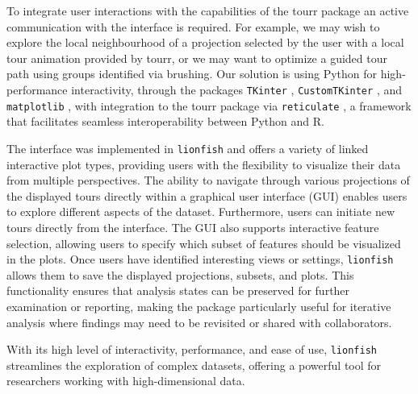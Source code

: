 \documentclass[article]{ajs}
\begin{document}
To integrate user interactions with the capabilities of the tourr package an active communication with the interface is required. For example, we may wish to explore the local neighbourhood of a projection selected by the user with a local tour animation provided by tourr, or we may want to optimize a guided tour path using groups identified via brushing.
Our solution is using Python for high-performance interactivity, through the packages \texttt{TKinter} \citep{lundh1999introduction}, \texttt{CustomTKinter} \citep{schimansky24}, and \texttt{matplotlib} \citep{Hunter:2007}, with integration to the tourr package \citep{tourr} via \texttt{reticulate} \citep{reticulate}, a framework that facilitates seamless interoperability between Python and R.


The interface was implemented in \texttt{lionfish} and offers a variety of linked interactive plot types, providing users with the flexibility to visualize their data from multiple perspectives. The ability to navigate through various projections of the displayed tours directly within a graphical user interface (GUI) enables users to explore different aspects of the dataset. Furthermore, users can initiate new tours directly from the interface. The GUI also supports interactive feature selection, allowing users to specify which subset of features should be visualized in the plots. Once users have identified interesting views or settings, \texttt{lionfish} allows them to save the displayed projections, subsets, and plots. This functionality ensures that analysis states can be preserved for further examination or reporting, making the package particularly useful for iterative analysis where findings may need to be revisited or shared with collaborators.

With its high level of interactivity, performance, and ease of use, \texttt{lionfish} streamlines the exploration of complex datasets, offering a powerful tool for researchers working with high-dimensional data.
\end{document}
